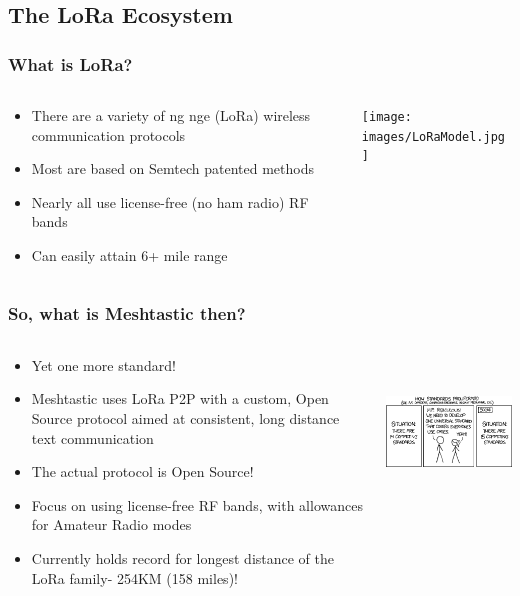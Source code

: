 \documentclass[aspectratio=169]{beamer}
\begin{document}
\subsection{The LoRa Ecosystem}
\frame{\subsectionpage}

\begin{frame}[fragile]
  \frametitle{What is LoRa?}
  \begin{columns}[]
    \begin{column}[T]{0.45\paperwidth}
      \begin{itemize}%
        \item{There are a variety of \color{red}{Lo}\color{black}ng \color{red}{Ra}\color{black}nge (LoRa) wireless communication protocols}
        \item{Most are based on Semtech patented methods}
        \item{Nearly all use license-free (no ham radio) RF bands}
        \item{Can easily attain 6+ mile range}
     \end{itemize}
    \end{column}
    \begin{column}[T]{0.35\paperwidth}
      \texttt{[image: images/LoRaModel.jpg]}
    \end{column}
  \end{columns}
\end{frame}

\begin{frame}[fragile]
  \frametitle{So, what is Meshtastic then?}
  \begin{columns}[]
    \begin{column}[T]{0.45\paperwidth}
      \begin{itemize}%
        \item{Yet one more standard!}
        \item{Meshtastic uses LoRa P2P with a custom, Open Source protocol aimed at consistent, long distance text communication}
        \item{The actual protocol is Open Source!}
        \item{Focus on using license-free RF bands, with allowances for Amateur Radio modes}
        \item{Currently holds record for longest distance of the LoRa family- 254KM (158 miles)!}
     \end{itemize}
    \end{column}
    \begin{column}[T]{0.45\paperwidth}
      \includegraphics[height=4cm,keepaspectratio]{images/standards.png}
    \end{column}
  \end{columns}
\end{frame}
\end{document}
